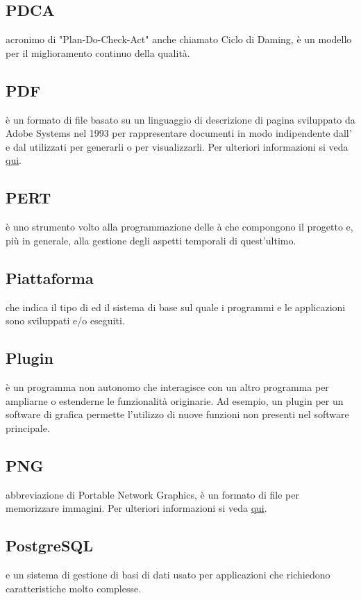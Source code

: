\documentclass[12pt,a4paper]{article}
\begin{document}
\subsection{PDCA} 
 acronimo di "Plan-Do-Check-Act" anche chiamato Ciclo di Daming, è un modello per il miglioramento continuo della qualità.

\subsection{PDF} 
 è un formato di file basato su un linguaggio di descrizione di pagina sviluppato da Adobe Systems nel 1993 per rappresentare documenti in modo indipendente dall’ e dal  utilizzati per generarli o per visualizzarli. Per ulteriori informazioni si veda \href{http://it.wikipedia.org/wiki/Portable_Document_Format}{qui}.

\subsection{PERT} 
 è uno strumento volto alla programmazione delle à che compongono il progetto e, più in generale, alla gestione degli aspetti temporali di quest'ultimo.

\subsection{Piattaforma} 
 che indica il tipo di  ed il sistema  di base sul quale i programmi e le applicazioni sono sviluppati e/o eseguiti.

\subsection{Plugin}
è un programma non autonomo che interagisce con un altro programma per ampliarne o estenderne le funzionalità originarie. Ad esempio, un plugin per un software di grafica permette l'utilizzo di nuove funzioni non presenti nel software principale.

\subsection{PNG} 
 abbreviazione di Portable Network Graphics, è un formato di file per memorizzare immagini. Per ulteriori informazioni si veda \href{http://it.wikipedia.org/wiki/Portable_Network_Graphics}{qui}.

\subsection{PostgreSQL} 
 e un sistema di gestione di basi di dati  usato per applicazioni che richiedono caratteristiche molto complesse.
\end{document}
